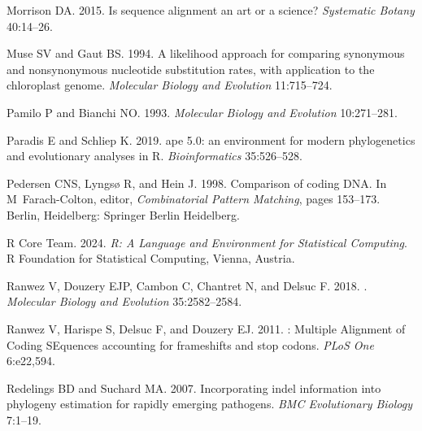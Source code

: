 \documentclass[12pt,letterpaper]{article}
\begin{document}
\begin{thebibliography}{43}
Morrison DA. 2015.
\newblock Is sequence alignment an art or a science?
\newblock \emph{Systematic Botany} 40:14--26.

Muse SV and Gaut BS. 1994.
\newblock A likelihood approach for comparing synonymous and nonsynonymous
  nucleotide substitution rates, with application to the chloroplast genome.
\newblock \emph{Molecular Biology and Evolution} 11:715--724.

Pamilo P and Bianchi NO. 1993.
\newblock \emph{Molecular Biology and Evolution} 10:271--281.

Paradis E and Schliep K. 2019.
\newblock ape 5.0: an environment for modern phylogenetics and evolutionary
  analyses in {R}.
\newblock \emph{Bioinformatics} 35:526--528.

Pedersen CNS, Lyngs{\o} R, and Hein J. 1998.
\newblock Comparison of coding {DNA}.
\newblock In M~Farach-Colton, editor, \emph{Combinatorial Pattern Matching},
  pages 153--173. Berlin, Heidelberg: Springer Berlin Heidelberg.

{R Core Team}. 2024.
\newblock \emph{R: A Language and Environment for Statistical Computing}.
\newblock R Foundation for Statistical Computing, Vienna, Austria.

Ranwez V, Douzery EJP, Cambon C, Chantret N, and Delsuc F. 2018.
.
\newblock \emph{Molecular Biology and Evolution} 35:2582--2584.

Ranwez V, Harispe S, Delsuc F, and Douzery EJ. 2011.
: {M}ultiple {A}lignment of {C}oding {SE}quences accounting
  for frameshifts and stop codons.
\newblock \emph{{PLoS} One} 6:e22,594.

Redelings BD and Suchard MA. 2007.
\newblock Incorporating indel information into phylogeny estimation for rapidly
  emerging pathogens.
\newblock \emph{BMC Evolutionary Biology} 7:1--19.


\end{thebibliography}
\end{document}
